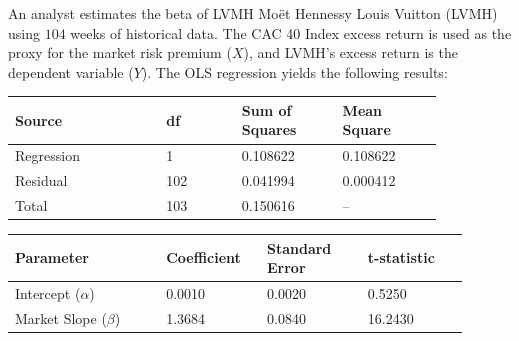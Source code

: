 \begin{tcolorbox}[
	colback=gray!5!white,
	colframe=black!15!white,
	boxrule=0.5pt,
	arc=3pt,
	title=\textbf{Case Study: Calculating LVMH's Beta},
	coltitle=black,
	colbacktitle=black!5!white,
	before skip=6pt,
	after skip=6pt,
	breakable
]
An analyst estimates the beta of LVMH Moët Hennessy Louis Vuitton (LVMH) using $104$ weeks of historical data. The CAC 40 Index excess return is used as the proxy for the market risk premium ($X$), and LVMH's excess return is the dependent variable ($Y$). The OLS regression yields the following results:

\begin{center}
\begin{tabular}{p{0.3\linewidth} p{0.15\linewidth} p{0.20\linewidth} p{0.20\linewidth}}
	\toprule
	\textbf{Source} & \textbf{df} & \textbf{Sum of Squares} & \textbf{Mean Square} \\
	\midrule
	Regression & 1 & 0.108622 & 0.108622 \\
	Residual & 102 & 0.041994 & 0.000412 \\
	Total & 103 & 0.150616 & -- \\
	\bottomrule
\end{tabular}
\end{center}

\begin{center}
\begin{tabular}{p{0.3\linewidth} p{0.20\linewidth} p{0.20\linewidth} p{0.20\linewidth}}
	\toprule
	\textbf{Parameter} & \textbf{Coefficient} & \textbf{Standard Error} & \textbf{t-statistic} \\
	\midrule
	Intercept ($\alpha$) & 0.0010 & 0.0020 & 0.5250 \\
	Market Slope ($\beta$) & 1.3684 & 0.0840 & 16.2430 \\
	\bottomrule
\end{tabular}
\end{center}


\end{tcolorbox}
